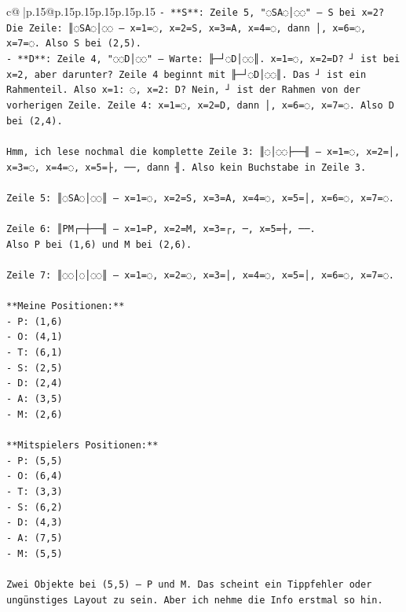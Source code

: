 \documentclass{article}
\begin{document}
{\begin{supertabular}{c@{$\;$}|p{.15\linewidth}@{}p{.15\linewidth}p{.15\linewidth}p{.15\linewidth}p{.15\linewidth}p{.15\linewidth}}
{{{\texttt{{-} **S**: Zeile 5, "◌SA◌│◌◌" — S bei x=2? Die Zeile: ║◌SA◌│◌◌ — x=1=◌, x=2=S, x=3=A, x=4=◌, dann │, x=6=◌, x=7=◌. Also S bei (2,5).} \\
\texttt{{-} **D**: Zeile 4, "◌◌D│◌◌" — Warte: ╟─┘◌D│◌◌║. x=1=◌, x=2=D? ┘ ist bei x=2, aber darunter? Zeile 4 beginnt mit ╟─┘◌D│◌◌║. Das ┘ ist ein Rahmenteil. Also x=1: ◌, x=2: D? Nein, ┘ ist der Rahmen von der vorherigen Zeile. Zeile 4: x=1=◌, x=2=D, dann │, x=6=◌, x=7=◌. Also D bei (2,4).} \\
\\ 
\texttt{Hmm, ich lese nochmal die komplette Zeile 3: ║◌│◌◌├──╢ — x=1=◌, x=2=│, x=3=◌, x=4=◌, x=5=├, ──, dann ╢. Also kein Buchstabe in Zeile 3.} \\
\\ 
\texttt{Zeile 5: ║◌SA◌│◌◌║ — x=1=◌, x=2=S, x=3=A, x=4=◌, x=5=│, x=6=◌, x=7=◌.} \\
\\ 
\texttt{Zeile 6: ║PM┌─┼──╢ — x=1=P, x=2=M, x=3=┌, ─, x=5=┼, ──.} \\
\texttt{Also P bei (1,6) und M bei (2,6).} \\
\\ 
\texttt{Zeile 7: ║◌◌│◌│◌◌║ — x=1=◌, x=2=◌, x=3=│, x=4=◌, x=5=│, x=6=◌, x=7=◌.} \\
\\ 
\texttt{**Meine Positionen:**} \\
\texttt{{-} P: (1,6)} \\
\texttt{{-} O: (4,1)} \\
\texttt{{-} T: (6,1)} \\
\texttt{{-} S: (2,5)} \\
\texttt{{-} D: (2,4)} \\
\texttt{{-} A: (3,5)} \\
\texttt{{-} M: (2,6)} \\
\\ 
\texttt{**Mitspielers Positionen:**} \\
\texttt{{-} P: (5,5)} \\
\texttt{{-} O: (6,4)} \\
\texttt{{-} T: (3,3)} \\
\texttt{{-} S: (6,2)} \\
\texttt{{-} D: (4,3)} \\
\texttt{{-} A: (7,5)} \\
\texttt{{-} M: (5,5)} \\
\\ 
\texttt{Zwei Objekte bei (5,5) — P und M. Das scheint ein Tippfehler oder ungünstiges Layout zu sein. Aber ich nehme die Info erstmal so hin.} \\
}}}
\end{supertabular}}
\end{document}
